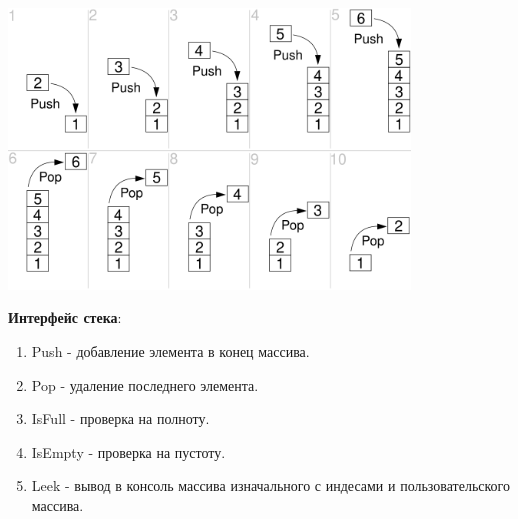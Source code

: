 \documentclass[14pt]{article}
\begin{document}
	\includegraphics[width = 0.8\textwidth, height = 0.5\textheight]{Stack}
	\label{fig:label1}
	
	\textbf{Интерфейс стека}:
	\begin{enumerate}
		\item Push - добавление элемента в конец массива.
		\item Pop - удаление последнего элемента.
		\item IsFull - проверка на полноту.
		\item IsEmpty - проверка на пустоту.
		\item Leek - вывод в консоль массива изначального с индесами и пользовательского массива.
	\end{enumerate}
	
\end{document}
